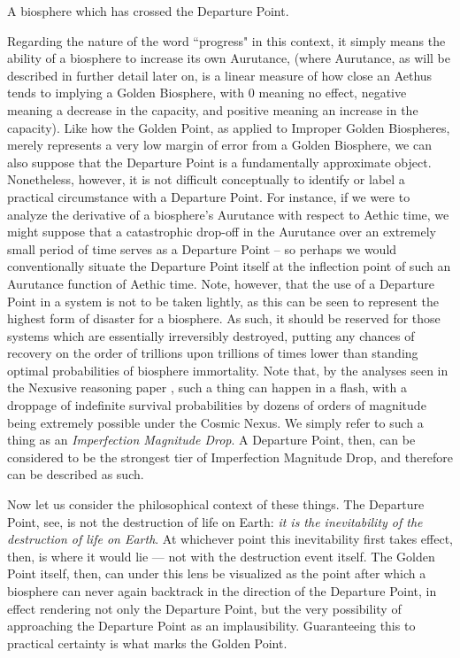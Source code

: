 \begin{concept}
    A biosphere which has crossed the Departure Point.
\end{concept}

Regarding the nature of the word ``progress" in this context, it simply means the ability of a biosphere to increase its own Aurutance, (where Aurutance, as will be described in further detail later on, is a linear measure of how close an Aethus tends to implying a Golden Biosphere, with 0 meaning no effect, negative meaning a decrease in the capacity, and positive meaning an increase in the capacity). Like how the Golden Point, as applied to Improper Golden Biospheres, merely represents a very low margin of error from a Golden Biosphere, we can also suppose that the Departure Point is a fundamentally approximate object. Nonetheless, however, it is not difficult conceptually to identify or label a practical circumstance with a Departure Point. For instance, if we were to analyze the derivative of a biosphere's Aurutance with respect to Aethic time, we might suppose that a catastrophic drop-off in the Aurutance over an extremely small period of time serves as a Departure Point -- so perhaps we would conventionally situate the Departure Point itself at the inflection point of such an Aurutance function of Aethic time. Note, however, that the use of a Departure Point in a system is not to be taken lightly, as this can be seen to represent the highest form of disaster for a biosphere. As such, it should be reserved for those systems which are essentially irreversibly destroyed, putting any chances of recovery on the order of trillions upon trillions of times lower than standing optimal probabilities of biosphere immortality. Note that, by the analyses seen in the Nexusive reasoning paper \cite{Nexus}, such a thing can happen in a flash, with a droppage of indefinite survival probabilities by dozens of orders of magnitude being extremely possible under the Cosmic Nexus. We simply refer to such a thing as an \textit{Imperfection Magnitude Drop}. A Departure Point, then, can be considered to be the strongest tier of Imperfection Magnitude Drop, and therefore can be described as such. 

Now let us consider the philosophical context of these things.
The Departure Point, see, is not the destruction of life on Earth: \textit{it is the inevitability of the destruction of life on Earth}. At whichever point this inevitability first takes effect, then, is where it would lie — not with the destruction event itself. The Golden Point itself, then, can under this lens be visualized as the point after which a biosphere can never again backtrack in the direction of the Departure Point, in effect rendering not only the Departure Point, but the very possibility of approaching the Departure Point as an implausibility. Guaranteeing this to practical certainty is what marks the Golden Point. 

